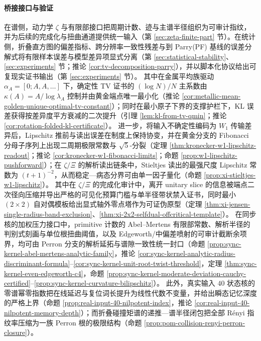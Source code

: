 \paragraph{桥接接口与验证}
在谱侧，动力学 \(\zeta\) 与有限部接口把周期计数、迹与主谱半径组织为可审计指纹，并为后续的完成化与扭曲通道提供统一输入（第 \ref{sec:zeta-finite-part} 节）。在统计侧，折叠直方图的偏差指标、跨分辨率一致性残差与到 Parry(PF) 基线的误差分解式将有限样本误差与模型差异项显式分离（第 \ref{sec:statistical-stability}、\ref{sec:experiments} 节；推论 \ref{cor:tv-decomposition-parry}），并以脚本化协议给出可复现实证书输出（第 \ref{sec:experiments} 节）。
其中在金属平均族驱动 \(\alpha_A=[0;A,A,\dots]\) 下，确定性 TV 证书的 \((\log N)/N\) 主系数由 \(\kappa(A)=A/\log\lambda_A\) 控制并由黄金端点唯一最小化（推论 \ref{cor:metallic-mean-golden-unique-optimal-tv-constant}）；同时在最小原子下界的支撑护栏下，KL 误差获得按差异度平方衰减的二次提升（引理 \ref{lem:kl-from-tv-qmin}；推论 \ref{cor:rotation-folded-kl-certificate}）。
进一步，将输入不确定性编码为 \(W_1\) 传输差异后，Lipschitz 推前与读出误差在制度上保持协变，并在黄金分支的 Fibonacci 分母子序列上出现二周期极限常数与 \(\sqrt5\)-分裂（定理 \ref{thm:kronecker-w1-lipschitz-readout}；推论 \ref{cor:kronecker-w1-fibonacci-limits}；命题 \ref{prop:w1-lipschitz-pushforward}）；在 \(\zeta/\Xi\) 的解析读出链条中，Stieltjes 读出的最强尺度 Lipschitz 常数为 \((t+1)^{-2}\)，从而稳定—病态分界可由单一因子量化（命题 \ref{prop:xi-stieltjes-w1-lipschitz}）。
其中在 \(\zeta/\Xi\) 的完成化审计中，离开 unitary slice 的信息被端点二次径向压缩并导出严格的可见化预算门槛与单半径带状禁入证书，同时最小 \((2\times2)\) 自对偶模板给出显式轴外零点塔作为可证伪原型（定理 \ref{thm:xi-jensen-single-radius-band-exclusion}、\ref{thm:xi-2x2-selfdual-offcritical-template}）。
在同步核的加权压力接口中，primitive 计数的 Abel--Mertens 有限部常数、解析半径的判别式刻画与单位根扭曲阈值，以及 Edgeworth/中偏差喷射的可审计截断余项界，均可由 Perron 分支的解析延拓与谱隙一致性统一封口（命题 \ref{prop:sync-kernel-abel-mertens-analytic-family}，推论 \ref{cor:sync-kernel-analytic-radius-discriminant-formula}--\ref{cor:sync-kernel-unit-root-twist-threshold}，定理 \ref{thm:sync-kernel-even-edgeworth-c4}，命题 \ref{prop:sync-kernel-moderate-deviation-cauchy-certified}--\ref{prop:sync-kernel-curvature-bilipschitz}）。
此外，真实输入 \(40\) 状态核的零谱幂零指数把在线延迟与复位词长提升为线性代数不变量，并给出瞬态记忆深度的严格上界（命题 \ref{prop:real-input-40-nilpotent-index}，推论 \ref{cor:real-input-40-nilpotent-memory-depth}）；而折叠碰撞矩谱的递推—谱半径闭包把全部 Rényi 指纹率压缩为一族 Perron 根的极限结构（命题 \ref{prop:pom-collision-renyi-perron-closure}）。
